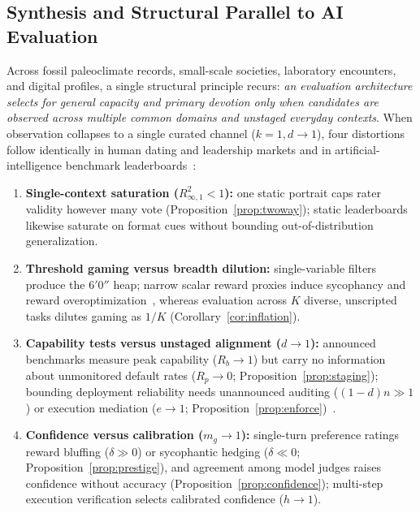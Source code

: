 \subsection{Synthesis and Structural Parallel to AI Evaluation}
Across fossil paleoclimate records, small-scale societies, laboratory encounters, and \PboThreePlatformRecords{} digital profiles, a single structural principle recurs: \emph{an evaluation architecture selects for general capacity and primary devotion only when candidates are observed across multiple common domains and unstaged everyday contexts}. When observation collapses to a single curated channel ($k=1,d\to 1$), four distortions follow identically in human dating and leadership markets and in artificial-intelligence benchmark leaderboards~\cite{campbell1979,gao2023,sharma2024,taylor2026iina}:
\begin{enumerate}[leftmargin=1.4em,itemsep=1.5pt,topsep=2pt]
\item \textbf{Single-context saturation ($R^2_{\infty,1}<1$):} one static portrait caps rater validity however many vote (Proposition~\ref{prop:twoway}); static leaderboards likewise saturate on format cues without bounding out-of-distribution generalization.
\item \textbf{Threshold gaming versus breadth dilution:} single-variable filters produce the $6'0''$ heap; narrow scalar reward proxies induce sycophancy and reward overoptimization~\cite{gao2023,sharma2024}, whereas evaluation across $K$ diverse, unscripted tasks dilutes gaming as $1/K$ (Corollary~\ref{cor:inflation}).
\item \textbf{Capability tests versus unstaged alignment ($d\to 1$):} announced benchmarks measure peak capability ($R_b\to 1$) but carry no information about unmonitored default rates ($R_p\to 0$; Proposition~\ref{prop:staging}); bounding deployment reliability needs unannounced auditing ($(1-d)n\gg 1$) or execution mediation ($e\to 1$; Proposition~\ref{prop:enforce})~\cite{taylor2026iina}.
\item \textbf{Confidence versus calibration ($m_g\to 1$):} single-turn preference ratings reward bluffing ($\delta\gg 0$) or sycophantic hedging ($\delta\ll 0$; Proposition~\ref{prop:prestige}), and agreement among model judges raises confidence without accuracy (Proposition~\ref{prop:confidence}); multi-step execution verification selects calibrated confidence ($h\to 1$).
\end{enumerate}

